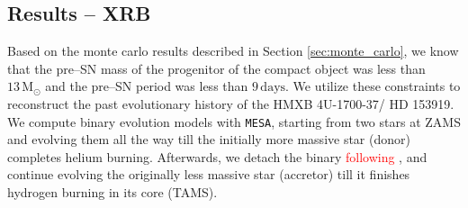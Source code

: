 \documentclass[linenumbers,trackchanges,twocolumn]{aastex701}
\newcommand{\Mdot}{\mathrm{M}_{\odot}}
\newcommand{\red}{\textcolor{red}}
\begin{document}
\subsection{Results -- XRB}

Based on the monte carlo results described in Section \ref{sec:monte_carlo}, we know that the pre--SN mass of the progenitor of the compact object was less than $13\,\Mdot$ and the pre--SN period was less than $9\, \mathrm{days}$. We utilize these constraints to reconstruct the past evolutionary history of the HMXB 4U-1700-37/ HD 153919. We compute binary evolution models with \texttt{MESA}, starting from two stars at ZAMS and evolving them all the way till the initially more massive star (donor) completes helium burning. Afterwards, we detach the binary \red{following \citep{2023ApJ...942L..32R}}, and continue evolving the originally less massive star (accretor) till it finishes hydrogen burning in its core (TAMS). 
\end{document}

